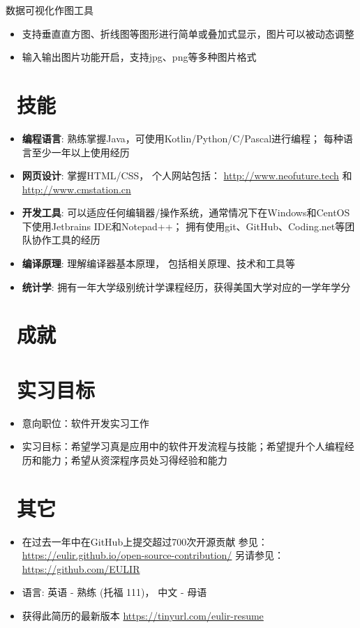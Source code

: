 \documentclass{resume}
\begin{document}
数据可视化作图工具
\begin{itemize}
  \item 支持垂直直方图、折线图等图形进行简单或叠加式显示，图片可以被动态调整
  \item 输入输出图片功能开启，支持jpg、png等多种图片格式
\end{itemize}

\section{\faCogs\ 技能}
\begin{itemize}[parsep=0.5ex]
  \item \textbf{编程语言}:
    熟练掌握Java，可使用Kotlin/Python/C/Pascal进行编程； 每种语言至少一年以上使用经历
  \item \textbf{网页设计}:
    掌握HTML/CSS， 个人网站包括： {\url{http://www.neofuture.tech}} 和 {\url{http://www.cmstation.cn}}
  \item \textbf{开发工具}:
    可以适应任何编辑器/操作系统，通常情况下在Windows和CentOS下使用Jetbrains IDE和Notepad++； 拥有使用git、GitHub、Coding.net等团队协作工具的经历
  \item \textbf{编译原理}:
    理解编译器基本原理， 包括相关原理、技术和工具等 
  \item \textbf{统计学}:
    拥有一年大学级别统计学课程经历，获得美国大学对应的一学年学分
\end{itemize}

\section{\faHeartO\ 成就}

\section{\faUsers\ 实习目标}
\begin{itemize}
  \item 意向职位：软件开发实习工作
  \item 实习目标：希望学习真是应用中的软件开发流程与技能；希望提升个人编程经历和能力；希望从资深程序员处习得经验和能力
\end{itemize}

\section{\faInfo\ 其它}
\begin{itemize}[parsep=0.5ex]
  \item 在过去一年中在GitHub上提交超过700次开源贡献 参见： \url{https://eulir.github.io/open-source-contribution/} 
    另请参见： {\url{https://github.com/EULIR}}
  \item 语言: 英语 - 熟练 (托福 111)， 中文 - 母语
  \item 获得此简历的最新版本 \url{https://tinyurl.com/eulir-resume}
\end{itemize}


%
%
\end{document}
